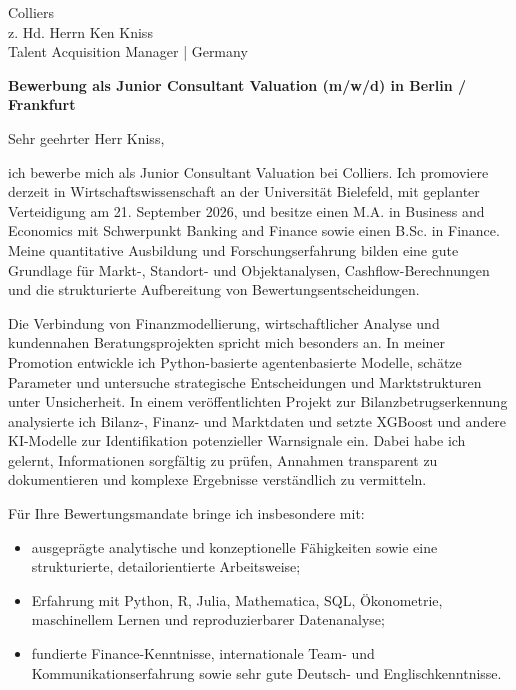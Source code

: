 \documentclass[11pt]{article}
\begin{document}
\noindent
Colliers \\
z. Hd. Herrn Ken Kniss \\
Talent Acquisition Manager | Germany

\vspace{0.05cm}

\noindent
\textbf{Bewerbung als Junior Consultant Valuation (m/w/d) in Berlin / Frankfurt}

\vspace{0.04cm}

\noindent Sehr geehrter Herr Kniss,

ich bewerbe mich als Junior Consultant Valuation bei Colliers. Ich promoviere derzeit in Wirtschaftswissenschaft an der Universität Bielefeld, mit geplanter Verteidigung am 21. September 2026, und besitze einen M.A. in Business and Economics mit Schwerpunkt Banking and Finance sowie einen B.Sc. in Finance. Meine quantitative Ausbildung und Forschungserfahrung bilden eine gute Grundlage für Markt-, Standort- und Objektanalysen, Cashflow-Berechnungen und die strukturierte Aufbereitung von Bewertungsentscheidungen.

Die Verbindung von Finanzmodellierung, wirtschaftlicher Analyse und kundennahen Beratungsprojekten spricht mich besonders an. In meiner Promotion entwickle ich Python-basierte agentenbasierte Modelle, schätze Parameter und untersuche strategische Entscheidungen und Marktstrukturen unter Unsicherheit. In einem veröffentlichten Projekt zur Bilanzbetrugserkennung analysierte ich Bilanz-, Finanz- und Marktdaten und setzte XGBoost und andere KI-Modelle zur Identifikation potenzieller Warnsignale ein. Dabei habe ich gelernt, Informationen sorgfältig zu prüfen, Annahmen transparent zu dokumentieren und komplexe Ergebnisse verständlich zu vermitteln.

Für Ihre Bewertungsmandate bringe ich insbesondere mit:

\begin{itemize}
    \item ausgeprägte analytische und konzeptionelle Fähigkeiten sowie eine strukturierte, detailorientierte Arbeitsweise;
    \item Erfahrung mit Python, R, Julia, Mathematica, SQL, Ökonometrie, maschinellem Lernen und reproduzierbarer Datenanalyse;
    \item fundierte Finance-Kenntnisse, internationale Team- und Kommunikationserfahrung sowie sehr gute Deutsch- und Englischkenntnisse.
\end{itemize}
\end{document}
